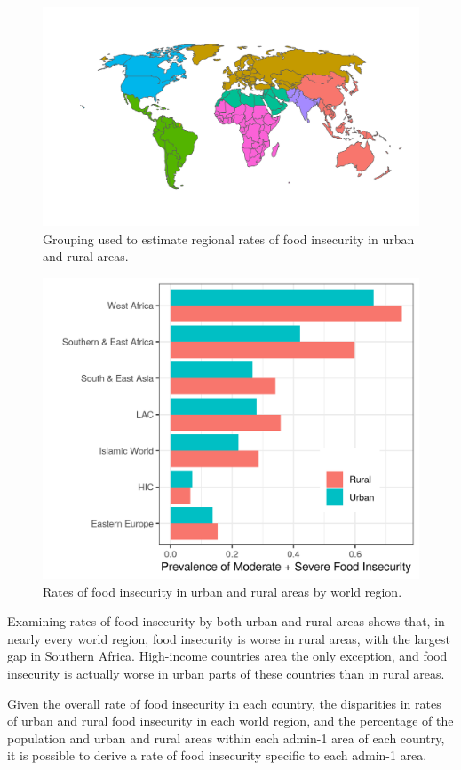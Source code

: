 \documentclass{article}
\begin{document}
\begin{figure}[h]
	\centering
	\includegraphics[width=\linewidth]{../figures/regions.png}
	\caption{Grouping used to estimate regional rates of food insecurity in urban and rural areas.}
	\label{fig:regions}
\end{figure}

\begin{figure}[h]
	\centering
	\includegraphics[width=0.75\linewidth]{../figures/Urban_Rural.png}
	\caption{Rates of food insecurity in urban and rural areas by world region.}
	\label{fig:regionrate}
\end{figure}

Examining rates of food insecurity by both urban and rural areas shows that, in nearly every world region, food insecurity is worse in rural areas, with the largest gap in Southern Africa.  High-income countries area the only exception, and food insecurity is actually worse in urban parts of these countries than in rural areas.

Given the overall rate of food insecurity in each country, the disparities in rates of urban and rural food insecurity in each world region, and the percentage of the population and urban and rural areas within each admin-1 area of each country, it is possible to derive a rate of food insecurity specific to each admin-1 area.
\end{document}
